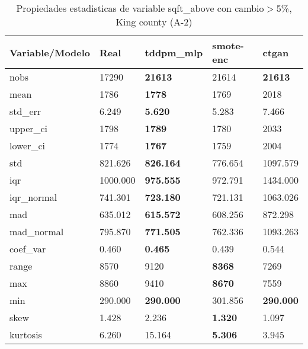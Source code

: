 \begin{table}[H]
\centering
\fontsize{8}{14}\selectfont
\caption{Propiedades estadisticas de variable sqft\_above con cambio\ensuremath{>}5\%, King county (A-2)}
\label{table-stats-king county-a-2-sqft_above-short}
\begin{tabular}{|l|m{10em}|m{10em}|m{10em}|m{10em}|}
\hline
 \rowcolor[gray]{0.8}
Variable/Modelo & Real & tddpm\_mlp & smote-enc & ctgan \\
\hline nobs & 17290 & \bfseries 21613 & \cellcolor[rgb]{0.9, 0.54, 0.52} 21614 & \bfseries 21613 \\
\hline mean & 1786 & \bfseries 1778 & 1769 & \cellcolor[rgb]{0.9, 0.54, 0.52} 2018 \\
\hline std\_err & 6.249 & \bfseries 5.620 & 5.283 & \cellcolor[rgb]{0.9, 0.54, 0.52} 7.466 \\
\hline upper\_ci & 1798 & \bfseries 1789 & 1780 & \cellcolor[rgb]{0.9, 0.54, 0.52} 2033 \\
\hline lower\_ci & 1774 & \bfseries 1767 & 1759 & \cellcolor[rgb]{0.9, 0.54, 0.52} 2004 \\
\hline std & 821.626 & \bfseries 826.164 & 776.654 & \cellcolor[rgb]{0.9, 0.54, 0.52} 1097.579 \\
\hline iqr & 1000.000 & \bfseries 975.555 & 972.791 & \cellcolor[rgb]{0.9, 0.54, 0.52} 1434.000 \\
\hline iqr\_normal & 741.301 & \bfseries 723.180 & 721.131 & \cellcolor[rgb]{0.9, 0.54, 0.52} 1063.026 \\
\hline mad & 635.012 & \bfseries 615.572 & 608.256 & \cellcolor[rgb]{0.9, 0.54, 0.52} 872.298 \\
\hline mad\_normal & 795.870 & \bfseries 771.505 & 762.336 & \cellcolor[rgb]{0.9, 0.54, 0.52} 1093.263 \\
\hline coef\_var & 0.460 & \bfseries 0.465 & 0.439 & \cellcolor[rgb]{0.9, 0.54, 0.52} 0.544 \\
\hline range & 8570 & 9120 & \bfseries 8368 & \cellcolor[rgb]{0.9, 0.54, 0.52} 7269 \\
\hline max & 8860 & 9410 & \bfseries 8670 & \cellcolor[rgb]{0.9, 0.54, 0.52} 7559 \\
\hline min & 290.000 & \bfseries 290.000 & \cellcolor[rgb]{0.9, 0.54, 0.52} 301.856 & \bfseries 290.000 \\
\hline skew & 1.428 & \cellcolor[rgb]{0.9, 0.54, 0.52} 2.236 & \bfseries 1.320 & 1.097 \\
\hline kurtosis & 6.260 & \cellcolor[rgb]{0.9, 0.54, 0.52} 15.164 & \bfseries 5.306 & 3.945 \\

\end{tabular}
\end{table}
